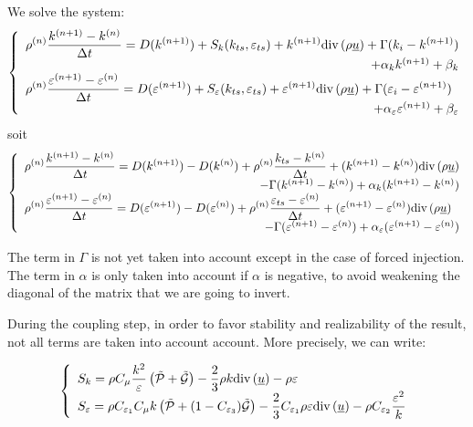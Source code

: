 We solve the system:
\begin{equation}
\left\{\begin{array}{l}
\displaystyle
\rho^{(n)}\frac{k^{(n+1)}-k^{(n)}}{\Delta t} =
D(k^{(n+1)}) + S_k(k_{ts},\varepsilon_{ts})
+k^{(n+1)}\dive(\rho\vect{u})+\Gamma(k_i-k^{(n+1)})\\
\multicolumn{1}{r}{+\alpha_k k^{(n+1)} +\beta_k}\\
\displaystyle
\rho^{(n)}\frac{\varepsilon^{(n+1)}-\varepsilon^{(n)}}{\Delta t}  =
D(\varepsilon^{(n+1)}) + S_\varepsilon(k_{ts},\varepsilon_{ts})
+\varepsilon^{(n+1)}\dive(\rho\vect{u})
+\Gamma(\varepsilon_i-\varepsilon^{(n+1)})\\
\multicolumn{1}{r}{+\alpha_\varepsilon \varepsilon^{(n+1)} +\beta_\varepsilon}
\end{array}\right.
\end{equation}
soit
\begin{equation}
\left\{\begin{array}{l}
\displaystyle
\rho^{(n)}\frac{k^{(n+1)}-k^{(n)}}{\Delta t} =
D(k^{(n+1)})-D(k^{(n)})+\rho^{(n)}\frac{k_{ts}-k^{(n)}}{\Delta t}
+(k^{(n+1)}-k^{(n)})\dive(\rho\vect{u})\\
\multicolumn{1}{r}{-\Gamma(k^{(n+1)}-k^{(n)})+\alpha_k(k^{(n+1)}-k^{(n)})}\\
\displaystyle
\rho^{(n)}\frac{\varepsilon^{(n+1)}-\varepsilon^{(n)}}{\Delta t}  =
D(\varepsilon^{(n+1)})-D(\varepsilon^{(n)})
+\rho^{(n)}\frac{\varepsilon_{ts}-\varepsilon^{(n)}}{\Delta t}
+(\varepsilon^{(n+1)}-\varepsilon^{(n)})\dive(\rho\vect{u})\\
\multicolumn{1}{r}{-\Gamma(\varepsilon^{(n+1)}-\varepsilon^{(n)})
+\alpha_\varepsilon(\varepsilon^{(n+1)}-\varepsilon^{(n)})}
\end{array}\right.
\end{equation}

The term in $\Gamma$ is not yet taken into account except in the case of
forced injection. The term in $\alpha$ is only taken into account if $\alpha$ is
negative, to avoid weakening the diagonal of the matrix that we are going to
invert.

During the coupling step, in order to favor stability and
realizability of the result, not all terms are taken into account
account. More precisely, we can write:

\begin{equation}
\left\{\begin{array}{l}
\displaystyle
S_k =
\rho C_\mu\frac{k^2}{\varepsilon}\left(\tilde{\mathcal{P}}+\tilde{\mathcal{G}}\right)
-\frac{2}{3}\rho k \text{div}\,(\underline{u})
-\rho\varepsilon\\
\displaystyle
S_\varepsilon =
\rho C_{\varepsilon_1} C_\mu k\left(\tilde{\mathcal{P}}
+(1-C_{\varepsilon_3})\tilde{\mathcal{G}}\right)
-\frac{2}{3}C_{\varepsilon_1}\rho \varepsilon \text{div}\,(\underline{u})
-\rho C_{\varepsilon_2}\frac{\varepsilon^2}{k}
\end{array}\right.
\end{equation}

